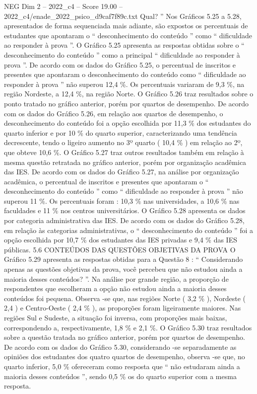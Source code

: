 \begin{textsample}{NEG Dim 2 – 2022\_c4 – Score 19.00 – 2022\_c4/enade\_2022\_psico\_d9caf7f89c.txt}
Qual? ” Nos Gráficos 5.25 a 5.28, apresentados de forma sequenciada mais adiante, são expostos os percentuais de estudantes que apontaram o “ desconhecimento do conteúdo ” como “ dificuldade ao responder à prova ”.
O Gráfico 5.25 apresenta as respostas obtidas sobre o “ desconhecimento do conteúdo ” como a principal “ dificuldade ao responder à prova ”.
De acordo com os dados do Gráfico 5.25, o percentual de inscritos e presentes que apontaram o desconhecimento do conteúdo como “ dificuldade ao responder à prova ” não superou 12,4 \%.
Os percentuais variaram de 9,3 \%, na região Nordeste, a 12,4 \%, na região Norte.
O Gráfico 5.26 traz resultados sobre o ponto tratado no gráfico anterior, porém por quartos de desempenho.
De acordo com os dados do Gráfico 5.26, em relação aos quartos de desempenho, o desconhecimento do conteúdo foi a opção escolhida por 11,3 \% dos estudantes do quarto inferior e por 10 \% do quarto superior, caracterizando uma tendência decrescente, tendo o ligeiro aumento no 3º quarto ( 10,4 \% ) em relação ao 2º, que obteve 10,6 \%.
O Gráfico 5.27 traz outros resultados também em relação à mesma questão retratada no gráfico anterior, porém por organização acadêmica das IES.
De acordo com os dados do Gráfico 5.27, na análise por organização acadêmica, o percentual de inscritos e presentes que apontaram o “ desconhecimento do conteúdo ” como “ dificuldade ao responder à prova ” não superou 11 \%.
Os percentuais foram : 10,3 \% nas universidades, a 10,6 \% nas faculdades e 11 \% nos centros universitários.
O Gráfico 5.28 apresenta os dados por categoria administrativa das IES.
De acordo com os dados do Gráfico 5.28, em relação às categorias administrativas, o “ desconhecimento do conteúdo ” foi a opção escolhida por 10,7 \% dos estudantes das IES privadas e 9,4 \% das IES públicas. 5.6 CONTEÚDOS DAS QUESTÕES OBJETIVAS DA PROVA O Gráfico 5.29 apresenta as respostas obtidas para a Questão 8 : “ Considerando apenas as questões objetivas da prova, você percebeu que não estudou ainda a maioria desses conteúdos? ”.
Na análise por grande região, a proporção de respondentes que escolheram a opção não estudou ainda a maioria desses conteúdos foi pequena.
Observa -se que, nas regiões Norte ( 3,2 \% ), Nordeste ( 2,4 ) e Centro-Oeste ( 2,4 \% ), as proporções foram ligeiramente maiores.
Nas regiões Sul e Sudeste, a situação foi inversa, com proporções mais baixas, correspondendo a, respectivamente, 1,8 \% e 2,1 \%.
O Gráfico 5.30 traz resultados sobre a questão tratada no gráfico anterior, porém por quartos de desempenho.
De acordo com os dados do Gráfico 5.30, considerando -se separadamente as opiniões dos estudantes dos quatro quartos de desempenho, observa -se que, no quarto inferior, 5,0 \% ofereceram como resposta que “ não estudaram ainda a maioria desses conteúdos ”, sendo 0,5 \% os do quarto superior com a mesma resposta.

\end{textsample}
